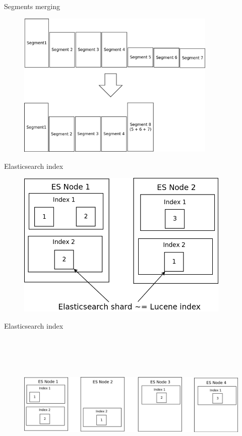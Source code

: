 \documentclass{beamer}
\begin{document}
\begin{frame}{Segments merging}
	\begin{figure}
		\includegraphics[width=\textwidth,height=7cm,keepaspectratio=true]{segments-merging}
	\end{figure}
\end{frame}
\begin{frame}{Elasticsearch index}
	\begin{figure}
		\includegraphics[width=\textwidth,height=7cm,keepaspectratio=true]{elasticsearch-index}
	\end{figure}
\end{frame}
\begin{frame}{Elasticsearch index}
	\begin{figure}
		\includegraphics[width=\textwidth,height=7cm,keepaspectratio=true]{elasticsearch-more-nodes}
	\end{figure}
\end{frame}
\end{document}
